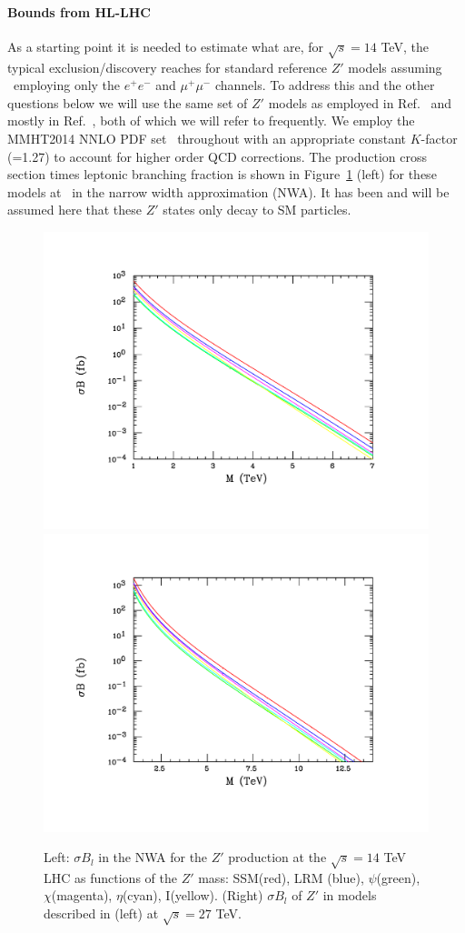 \documentclass[a4paper,11pt]{article}
\begin{document}
\paragraph*{Bounds from HL-LHC}
As a starting point it is needed to estimate what are, for $\sqrt s=14$ TeV, the typical exclusion/discovery reaches for standard reference $Z'$ models assuming \intlumihllhc\ employing only the $e^+e^-$ and $\mu^+\mu^-$ channels. To address this and the other questions below we will use the same set of $Z'$ models as employed
in Ref.~\cite{Rizzo:2014xma} and mostly in Ref.~\cite{Han:2013mra}, both of which we will refer to frequently. We employ the MMHT2014 NNLO PDF set~\cite{Harland-Lang:2014zoa}
throughout with an appropriate constant $K$-factor (=1.27) to account for higher order QCD corrections. The production cross section times leptonic branching fraction is shown in Figure~\ref{fig:pheno:toy} (left) for these models at \sqrtslhc\ in the narrow width approximation (NWA). It has been and will be assumed here that these $Z'$ states only decay to SM particles.


\begin{figure}[htbp]
  \centering
    \includegraphics[trim={2cm 2cm 2cm 2cm},clip,width=0.45\columnwidth]{Fig/zp14tev-ref.pdf}
    \includegraphics[trim={2cm 2cm 2cm 2cm},clip,width=0.45\columnwidth]{Fig/zp27tev-ref.pdf}
    \caption{Left: $\sigma B_l$ in the NWA for the $Z'$ production at the $\sqrt s=14$ TeV LHC as functions of the $Z'$ mass: SSM(red), LRM (blue), $\psi$(green), $\chi$(magenta),
$\eta$(cyan), I(yellow). (Right) $\sigma B_l$ of $Z'$ in models described in (left) at $\sqrt s=27$ TeV.}
\label{fig:pheno:toy}
\end{figure}
\end{document}
